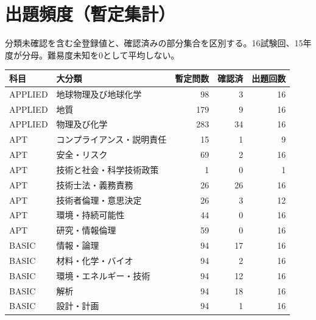 \chapter{出題頻度（暫定集計）}
分類未確認を含む全登録値と、確認済みの部分集合を区別する。16試験回、15年度が分母。難易度未知を0として平均しない。
\begin{longtable}{p{.16\linewidth}p{.42\linewidth}rrr}
科目 & 大分類 & 暫定問数 & 確認済 & 出題回数\\\hline
APPLIED & 地球物理及び地球化学 & 98 & 3 & 16\\
APPLIED & 地質 & 179 & 9 & 16\\
APPLIED & 物理及び化学 & 283 & 34 & 16\\
APT & コンプライアンス・説明責任 & 15 & 1 & 9\\
APT & 安全・リスク & 69 & 2 & 16\\
APT & 技術と社会・科学技術政策 & 1 & 0 & 1\\
APT & 技術士法・義務責務 & 26 & 26 & 16\\
APT & 技術者倫理・意思決定 & 26 & 3 & 12\\
APT & 環境・持続可能性 & 44 & 0 & 16\\
APT & 研究・情報倫理 & 59 & 0 & 16\\
BASIC & 情報・論理 & 94 & 17 & 16\\
BASIC & 材料・化学・バイオ & 94 & 2 & 16\\
BASIC & 環境・エネルギー・技術 & 94 & 12 & 16\\
BASIC & 解析 & 94 & 18 & 16\\
BASIC & 設計・計画 & 94 & 1 & 16\\
\end{longtable}
